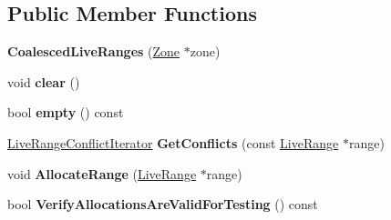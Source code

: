\subsection*{Public Member Functions}
\begin{DoxyCompactItemize}
\item 
{\bfseries Coalesced\+Live\+Ranges} (\hyperlink{classv8_1_1internal_1_1_zone}{Zone} $\ast$zone)\hypertarget{classv8_1_1internal_1_1compiler_1_1_coalesced_live_ranges_a6200de418563832c393cd3162b3978a0}{}\label{classv8_1_1internal_1_1compiler_1_1_coalesced_live_ranges_a6200de418563832c393cd3162b3978a0}

\item 
void {\bfseries clear} ()\hypertarget{classv8_1_1internal_1_1compiler_1_1_coalesced_live_ranges_aa65fa877d2578a16b52f0cd349ee4e7e}{}\label{classv8_1_1internal_1_1compiler_1_1_coalesced_live_ranges_aa65fa877d2578a16b52f0cd349ee4e7e}

\item 
bool {\bfseries empty} () const \hypertarget{classv8_1_1internal_1_1compiler_1_1_coalesced_live_ranges_af6d73fa27d93e02b82bee5cde6b042f0}{}\label{classv8_1_1internal_1_1compiler_1_1_coalesced_live_ranges_af6d73fa27d93e02b82bee5cde6b042f0}

\item 
\hyperlink{classv8_1_1internal_1_1compiler_1_1_live_range_conflict_iterator}{Live\+Range\+Conflict\+Iterator} {\bfseries Get\+Conflicts} (const \hyperlink{classv8_1_1internal_1_1compiler_1_1_live_range}{Live\+Range} $\ast$range)\hypertarget{classv8_1_1internal_1_1compiler_1_1_coalesced_live_ranges_a82d7e8207ae9c973bbcf68f3e67a8a7b}{}\label{classv8_1_1internal_1_1compiler_1_1_coalesced_live_ranges_a82d7e8207ae9c973bbcf68f3e67a8a7b}

\item 
void {\bfseries Allocate\+Range} (\hyperlink{classv8_1_1internal_1_1compiler_1_1_live_range}{Live\+Range} $\ast$range)\hypertarget{classv8_1_1internal_1_1compiler_1_1_coalesced_live_ranges_a75cbd0251a459faf1f59e8de20a3f900}{}\label{classv8_1_1internal_1_1compiler_1_1_coalesced_live_ranges_a75cbd0251a459faf1f59e8de20a3f900}

\item 
bool {\bfseries Verify\+Allocations\+Are\+Valid\+For\+Testing} () const \hypertarget{classv8_1_1internal_1_1compiler_1_1_coalesced_live_ranges_ad2ba245214dd4fa0254d82c243bd0921}{}\label{classv8_1_1internal_1_1compiler_1_1_coalesced_live_ranges_ad2ba245214dd4fa0254d82c243bd0921}

\end{DoxyCompactItemize}
